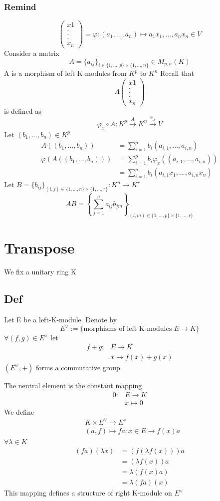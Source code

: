 \documentclass{book}
\begin{document}
\subsection{Remind}
$$\left(\begin{aligned}
    x1\\.\\.\\.\\x_n
\end{aligned}\right)=\varphi:(a_1,...,a_n)\mapsto a_1x_1,...,a_nx_n\in V$$
Consider a matrix $$A=\{a_{ij}\}_{i\in\{1,...,p\}\times\{1,...,n\}}\in M_{p,n}(K)$$
A is a morphism of left K-modules from $K^p$ to $K^n$
Recall that $$A\left(\begin{aligned}
    x1\\.\\.\\.\\x_n
\end{aligned}\right)$$ is defined as $$\varphi_x\circ A: K^p\xrightarrow{A} K^n\xrightarrow{\varphi_x} V$$
Let $(b_1,...,b_n)\in K^p$$$
\begin{aligned}
    A((b_1,...,b_n))&=\sum\limits_{i=1}^pb_i(a_{i,1},...,a_{i,n})\\
    \varphi(A((b_1,...,b_n)))
    &=\sum\limits_{i=1}^pb_i\varphi_x((a_{i,1},...,a_{i,n}))\\
    &=\sum\limits_{i=1}^pb_i(a_{i,1}x_1,...,a_{i,n}x_n)
\end{aligned}$$
Let $B=\{b_{ij}\}_{(i,j)\in \{1,...,n\}\times\{1,...,r\}}:K^n\rightarrow K^r$
$$AB=\left\{\sum\limits_{j=1}^na_{lj}b_{jm}\right\}_{(l,m)\in\{1,...,p\}\times\{1,...,r\}}$$
\chapter{Transpose}
We fix a unitary ring K
\section{Def}
Let E be a left-K-module. Denote by $$E^\vee:=\{\text{morphisms of left K-modules }E\rightarrow K\}$$
$\forall(f,g)\in E^\vee$ let $$\begin{aligned}
    f+g:&E\rightarrow K\\ &x\mapsto f(x)+g(x)
\end{aligned}
$$
$(E^\vee,+)$ forms a commutative group.

The neutral element is the constant mapping $$\begin{aligned}
    0:&E\rightarrow K\\ &x\mapsto 0
\end{aligned}$$
We define $$\begin{aligned}
&K\times E^\vee\rightarrow E^\vee\\
&(a,f)\mapsto fa:x\in E\rightarrow f(x)a
\end{aligned}$$
$\forall \lambda \in K$
$$
\begin{aligned}
(fa)(\lambda x)&=(f(\lambda f(x)))a\\
&=(\lambda f(x))a\\
&=\lambda(f(x)a)\\
&=\lambda(fa)(x)
\end{aligned}$$
This mapping defines a structure of right K-module on $E^\vee$
\end{document}
